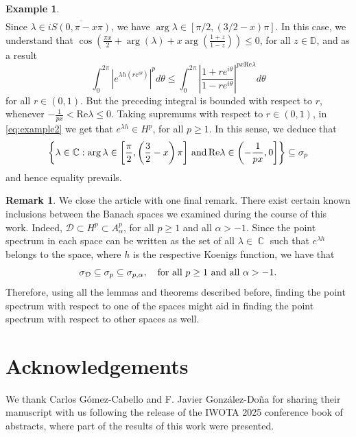 \documentclass[11pt]{amsart}
\numberwithin{equation}{section}
\theoremstyle{definition}
\newtheorem{remark}[theorem]{Remark}
\newtheorem{example}[theorem]{Example}
\DeclareMathOperator{\C}{\mathbb{C}}
\begin{document}
\begin{example}
\begin{align*}
		\end{align*}
		Since $\lambda\in i\overline{S(0,\pi-x\pi)}$, we have $\arg\lambda\in[\pi/2,(3/2-x)\pi]$. In this case, we understand that $\cos\left(\frac{\pi x}{2}+\arg(\lambda)+ x \arg\left(\frac{1+z}{1-z}\right)\right)\le0$, for all $z\in\mathbb{D}$, and as a result 
		\begin{equation}\label{eq:example2}
			\int_0^{2\pi} \left|e^{\lambda h(re^{i\theta})}\right|^p d\theta \le\int_0^{2\pi}\left|\frac{1+re^{i \theta}}{1-re^{i\theta}}\right|^{p x \mathrm{Re}\lambda} d\theta
		\end{equation}
		for all $r\in(0,1)$. But the preceding integral is bounded with respect to $r$, whenever $-\frac{1}{px}<\mathrm{Re}\lambda\le0$. Taking supremums with respect to $r\in(0,1)$, in \eqref{eq:example2} we get that $e^{\lambda h}\in H^p$, for all $p\ge1$. In this sense, we deduce that 
		$$\left\{\lambda\in\mathbb{C}: \arg\lambda\in\left[\frac{\pi}{2},\left(\frac{3}{2}-x\right)\pi\right] \, \textup{and} \,  \mathrm{Re}\lambda\in\left(-\frac{1}{px},0\right]\right\}\subseteq\sigma_p$$
		and hence equality prevails.
	\end{example}
	
	\begin{remark}
		We close the article with one final remark. There exist certain known inclusions between the Banach spaces we examined during the course of this work. Indeed, $\mathcal{D}\subset H^p\subset A^p_\alpha$, for all $p\ge1$ and all $\alpha>-1$. Since the point spectrum in each space can be written as the set of all $\lambda\in\C$ such that $e^{\lambda h}$ belongs to the space, where $h$ is the respective Koenigs function, we have that
		\begin{equation}\label{eq:space inclusions}
			\sigma_{\mathcal{D}}\subseteq \sigma_p \subseteq \sigma_{p,\alpha},\quad \textup{for all }p\ge1 \textup{ and all }\alpha>-1.
		\end{equation}
		Therefore, using all the lemmas and theorems described before, finding the point spectrum with respect to one of the spaces might aid in finding the point spectrum with respect to other spaces as well.
	\end{remark}
	
	
	
	
	
\section*{Acknowledgements}
	We thank Carlos G\'{o}mez-Cabello and F. Javier Gonz\'{a}lez-Do\~{n}a for sharing their manuscript \cite{carlos-javi} with us following the release of the IWOTA 2025 conference book of abstracts, where part of the results of this work were presented.
	
\end{document}
